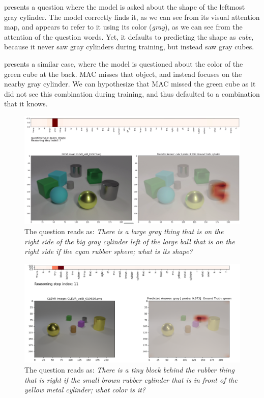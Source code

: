  presents a question where the model is asked about the shape of the leftmost gray cylinder. The model correctly finds it, as we can see from its visual attention map, and appears to refer to it using its color (\textit{gray}), as we can see from the attention of the question words. Yet, it defaults to predicting the shape as \textit{cube}, because it never saw gray cylinders during training, but instead saw gray cubes.

 presents a similar case, where the model is questioned about the color of the green cube at the back. MAC misses that object, and instead focuses on the nearby gray cylinder. We can hypothesize that MAC missed the green cube as it did not see this combination during training, and thus defaulted to a combination that it knows.


\begin{figure}[htbp]
	\centering
	\includegraphics[width=\textwidth]{../img/fail_mac_cogent_b_shape.png}
	\caption{The question reads as: \textit{There is a large gray thing that is on the right side of the big gray cylinder left of the large ball that is on the right side if the cyan rubber sphere; what is its shape?}}
	\label{fig:fail_mac_shape}
\end{figure}

\begin{figure}[htbp]
	\centering
	\includegraphics[width=\textwidth]{../img/fail_mac_cogent_b_color.png}
	\caption{The question reads as: \textit{There is a tiny block behind the rubber thing that is right if the small brown rubber cylinder that is in front of the yellow metal cylinder; what color is it?}}
	\label{fig:fail_mac_color}
\end{figure}

